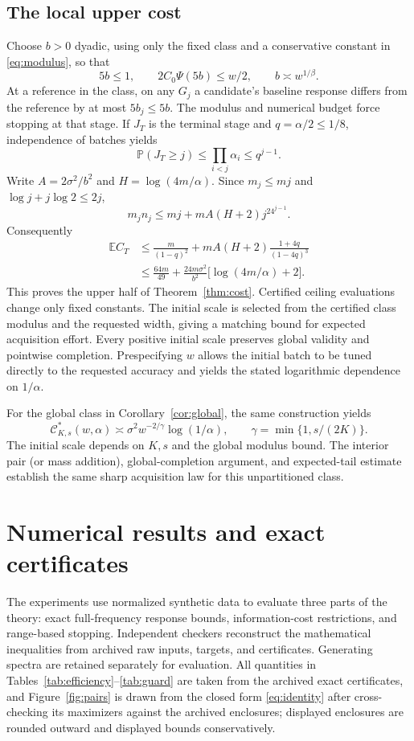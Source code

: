 \documentclass[10pt]{amsart}
\theoremstyle{definition}
\theoremstyle{remark}
\theoremstyle{plain}
\newcommand{\E}{\mathbb E}
\newcommand{\Prob}{\mathbb P}
\begin{document}
\subsection{The local upper cost}
Choose $b>0$ dyadic, using only the fixed class and a conservative constant in \eqref{eq:modulus}, so that
\begin{equation}\label{eq:bchoice}
 5b\le1,\qquad 2C_0\Psi(5b)\le w/2,\qquad b\asymp w^{1/\beta}.
\end{equation}
At a reference in the class, on any $G_j$ a candidate's baseline response differs from the reference by at most $5b_j\le5b$. The modulus and numerical budget force stopping at that stage. If $J_T$ is the terminal stage and $q=\alpha/2\le1/8$, independence of batches yields
\[
 \Prob(J_T\ge j)\le\prod_{i<j}\alpha_i\le q^{j-1}.
\]
Write $A=2\sigma^2/b^2$ and $H=\log(4m/\alpha)$. Since $m_j\le mj$ and $\log j+j\log2\le2j$,
\[
 m_jn_j\le mj+mA(H+2)j^24^{j-1}.
\]
Consequently
\begin{align}\label{eq:costupper}
 \E C_T
 &\le\frac{m}{(1-q)^2}
       +mA(H+2)\frac{1+4q}{(1-4q)^3}\\
 &\le\frac{64m}{49}
       +\frac{24m\sigma^2}{b^2}\bigl[\log(4m/\alpha)+2\bigr].\nonumber
\end{align}
This proves the upper half of Theorem~\ref{thm:cost}. Certified ceiling evaluations change only fixed constants. The initial scale is selected from the certified class modulus and the requested width, giving a matching bound for expected acquisition effort. Every positive initial scale preserves global validity and pointwise completion. Prespecifying $w$ allows the initial batch to be tuned directly to the requested accuracy and yields the stated logarithmic dependence on $1/\alpha$.

For the global class in Corollary~\ref{cor:global}, the same construction yields
\[
 \mathcal C^*_{K,s}(w,\alpha)
 \asymp \sigma^2w^{-2/\gamma}\log(1/\alpha),\qquad
 \gamma=\min\{1,s/(2K)\}.
\]
The initial scale depends on $K,s$ and the global modulus bound. The interior pair (or mass addition), global-completion argument, and expected-tail estimate establish the same sharp acquisition law for this unpartitioned class.

\section{Numerical results and exact certificates}\label{sec:experiments}
The experiments use normalized synthetic data to evaluate three parts of the theory: exact full-frequency response bounds, information-cost restrictions, and range-based stopping. Independent checkers reconstruct the mathematical inequalities from archived raw inputs, targets, and certificates. Generating spectra are retained separately for evaluation. All quantities in Tables~\ref{tab:efficiency}--\ref{tab:guard} are taken from the archived exact certificates, and Figure~\ref{fig:pairs} is drawn from the closed form \eqref{eq:identity} after cross-checking its maximizers against the archived enclosures; displayed enclosures are rounded outward and displayed bounds conservatively.
\end{document}
